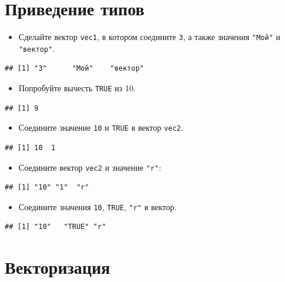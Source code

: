\documentclass[]{book}
\providecommand{\tightlist}{%
  \setlength{\itemsep}{0pt}\setlength{\parskip}{0pt}}
\begin{document}
\section{Приведение типов}\label{task_coer}

\begin{itemize}
\tightlist
\item
  Сделайте вектор \texttt{vec1}, в котором соедините \texttt{3}, а также
  значения \texttt{"Мой"} и \texttt{"вектор"}.
\end{itemize}

\begin{verbatim}
## [1] "3"      "Мой"    "вектор"
\end{verbatim}

\begin{itemize}
\tightlist
\item
  Попробуйте вычесть \texttt{TRUE} из 10.
\end{itemize}

\begin{verbatim}
## [1] 9
\end{verbatim}

\begin{itemize}
\tightlist
\item
  Соедините значение \texttt{10} и \texttt{TRUE} в вектор \texttt{vec2}.
\end{itemize}

\begin{verbatim}
## [1] 10  1
\end{verbatim}

\begin{itemize}
\tightlist
\item
  Соедините вектор \texttt{vec2} и значение \texttt{"r"}:
\end{itemize}

\begin{verbatim}
## [1] "10" "1"  "r"
\end{verbatim}

\begin{itemize}
\tightlist
\item
  Соедините значения \texttt{10}, \texttt{TRUE}, \texttt{"r"} в вектор.
\end{itemize}

\begin{verbatim}
## [1] "10"   "TRUE" "r"
\end{verbatim}

\section{Векторизация}\label{task_vec_ion}
\end{document}
